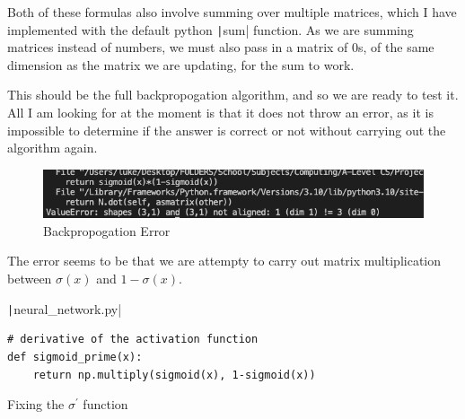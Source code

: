 \documentclass[12pt]{report}
\newcommand{\pil}[1]{\protect\texttt|#1|}
\begin{document}
Both of these formulas also involve summing over multiple matrices, which I have implemented with the default python \pil{sum} function. As we are summing matrices instead of numbers, we must also pass in a matrix of 0s, of the same dimension as the matrix we are updating, for the sum to work.

This should be the full backpropogation algorithm, and so we are ready to test it. All I am looking for at the moment is that it does not throw an error, as it is impossible to determine if the answer is correct or not without carrying out the algorithm again.

\begin{center}
\end{center}

\begin{figure}[H]
\centering
\includegraphics[width=14cm]{ss8.1.png}
\caption{Backpropogation Error}\label{fig:ss8.1}
\end{figure}

The error seems to be that we are attempty to carry out matrix multiplication between $\sigma\left(x\right)$ and $1-\sigma\left(x\right)$.

\begin{listing}[H]
\pil{neural_network.py}
\begin{verbatim}
# derivative of the activation function
def sigmoid_prime(x):
    return np.multiply(sigmoid(x), 1-sigmoid(x))
\end{verbatim}
\caption{Fixing the ${\sigma}^{\prime}$ function}\label{cs:fixSigmoidPrime}
\end{listing}
\end{document}
